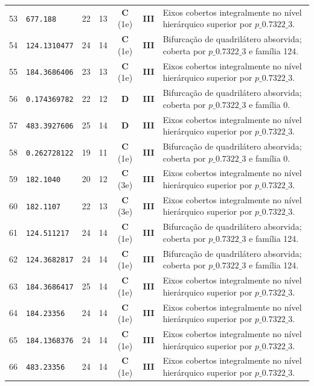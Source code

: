 \documentclass[11pt,a4paper]{article}
\begin{document}
\begin{small}
\begin{longtable}{r l c c c c p{8.8cm}}
53 & \texttt{677.188} & 22 & 13 & \textbf{C} (1e) & \textbf{III} & Eixos cobertos integralmente no nível hierárquico superior por $p\_0.7322\_3$. \\
54 & \texttt{124.1310477} & 24 & 14 & \textbf{C} (1e) & \textbf{III} & Bifurcação de quadrilátero absorvida; coberta por $p\_0.7322\_3$ e família 124. \\
55 & \texttt{184.3686406} & 23 & 13 & \textbf{C} (1e) & \textbf{III} & Eixos cobertos integralmente no nível hierárquico superior por $p\_0.7322\_3$. \\
56 & \texttt{0.174369782} & 22 & 12 & \textbf{D} & \textbf{III} & Bifurcação de quadrilátero absorvida; coberta por $p\_0.7322\_3$ e família 0. \\
57 & \texttt{483.3927606} & 25 & 14 & \textbf{D} & \textbf{III} & Eixos cobertos integralmente no nível hierárquico superior por $p\_0.7322\_3$. \\
58 & \texttt{0.262728122} & 19 & 11 & \textbf{C} (1e) & \textbf{III} & Bifurcação de quadrilátero absorvida; coberta por $p\_0.7322\_3$ e família 0. \\
59 & \texttt{182.1040} & 20 & 12 & \textbf{C} (3e) & \textbf{III} & Eixos cobertos integralmente no nível hierárquico superior por $p\_0.7322\_3$. \\
60 & \texttt{182.1107} & 22 & 13 & \textbf{C} (3e) & \textbf{III} & Eixos cobertos integralmente no nível hierárquico superior por $p\_0.7322\_3$. \\
61 & \texttt{124.511217} & 24 & 14 & \textbf{C} (1e) & \textbf{III} & Bifurcação de quadrilátero absorvida; coberta por $p\_0.7322\_3$ e família 124. \\
62 & \texttt{124.3682817} & 24 & 14 & \textbf{C} (1e) & \textbf{III} & Bifurcação de quadrilátero absorvida; coberta por $p\_0.7322\_3$ e família 124. \\
63 & \texttt{184.3686417} & 25 & 14 & \textbf{C} (1e) & \textbf{III} & Eixos cobertos integralmente no nível hierárquico superior por $p\_0.7322\_3$. \\
64 & \texttt{184.23356} & 24 & 14 & \textbf{C} (1e) & \textbf{III} & Eixos cobertos integralmente no nível hierárquico superior por $p\_0.7322\_3$. \\
65 & \texttt{184.1368376} & 24 & 14 & \textbf{C} (1e) & \textbf{III} & Eixos cobertos integralmente no nível hierárquico superior por $p\_0.7322\_3$. \\
66 & \texttt{483.23356} & 24 & 14 & \textbf{C} (1e) & \textbf{III} & Eixos cobertos integralmente no nível hierárquico superior por $p\_0.7322\_3$. \\

\end{longtable}
\end{small}
\end{document}
